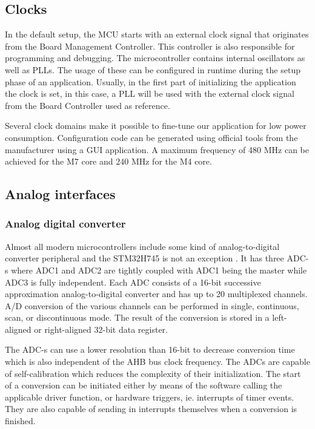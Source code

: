 \subsection{Clocks}

In the default setup, the MCU starts with an external clock signal that originates from the Board Management Controller. This controller is also responsible for programming and debugging. The microcontroller contains internal oscillators as well as PLLs. The usage of these can be configured in runtime during the setup phase of an application. Usually, in the first part of initializing the application the clock is set, in this case, a PLL will be used with the external clock signal from the Board Controller used as reference.

Several clock domains make it possible to fine-tune our application for low power consumption. Configuration code can be generated using official tools from the manufacturer using a GUI application. A maximum frequency of 480 MHz can be achieved for the M7 core and 240 MHz for the M4 core.

\subsection{Analog interfaces}

\subsubsection{Analog digital converter}

Almost all modern microcontrollers include some kind of analog-to-digital converter peripheral and the STM32H745 is not an exception \cite{ADCDescription}. It has three ADC-s where ADC1 and ADC2 are tightly coupled with ADC1 being the master while ADC3 is fully independent. Each ADC consists of a 16-bit successive approximation analog-to-digital converter and has up to 20 multiplexed channels. A/D conversion of the various channels can be performed in single, continuous, scan, or discontinuous mode. The result of the conversion is stored in a left-aligned or right-aligned 32-bit data register.

The ADC-s can use a lower resolution than 16-bit to decrease conversion time which is also independent of the AHB bus clock frequency. The ADCs are capable of self-calibration which reduces the complexity of their initialization. The start of a conversion can be initiated either by means of the software calling the applicable driver function, or hardware triggers, ie. interrupts of timer events. They are also capable of sending in interrupts themselves when a conversion is finished.

